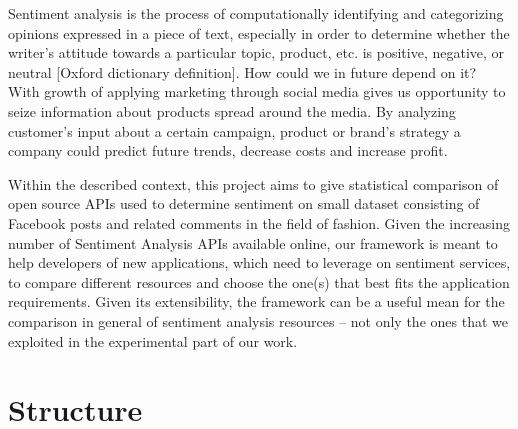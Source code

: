 	Sentiment analysis is the process of computationally identifying and categorizing opinions expressed in a piece of text, especially in order to determine whether the writer's attitude towards a particular topic, product, etc. is positive, negative, or neutral [Oxford dictionary definition]. How could we in future depend on it? With growth of applying marketing through social media gives us opportunity to seize information about products spread around the media. By analyzing customer's input about a certain campaign, product or brand's strategy a company could predict future trends, decrease costs and increase profit.
	
	Within the described context, this project aims to give statistical comparison of open source APIs used to determine sentiment on small dataset consisting of Facebook posts and related comments in the field of fashion. Given the increasing number of Sentiment Analysis APIs available online, our framework is meant to help developers of new applications, which need to leverage on sentiment services, to compare different resources and choose the one(s) that best fits the application requirements. Given its extensibility, the framework can be a useful mean for the comparison in general of sentiment analysis resources -- not only the ones that we exploited in the experimental part of our work.

\section{Structure}

